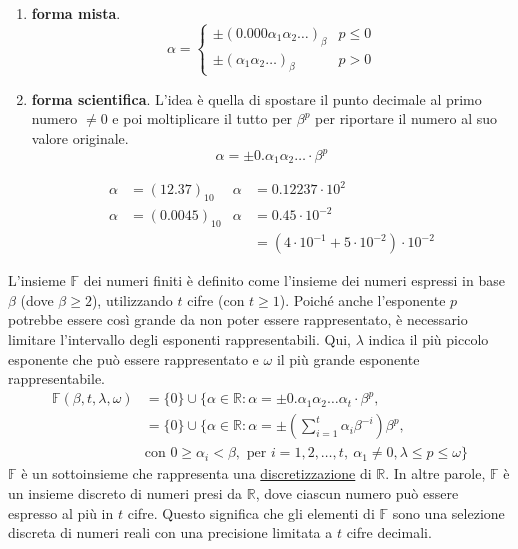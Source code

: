 \documentclass{article}
\begin{document}
\begin{enumerate}
    \item \textbf{forma mista}.
        $$\alpha=\begin{cases}
            \pm(0.000\alpha_1\alpha_2\ldots)_\beta & p\leq 0\\
            \pm(\alpha_1\alpha_2\ldots)_\beta & p>0
        \end{cases}$$
    \item \textbf{forma scientifica}. L'idea è quella di spostare il punto decimale al primo numero $\neq 0$ e
        poi moltiplicare il tutto per $\beta^p$ per riportare il numero al suo valore originale.
        $$\alpha=\pm0.\alpha_1\alpha_2\ldots\cdot\beta^p$$
        \begin{example}
            \begin{equation*}
               \begin{aligned}
                   \alpha&=(12.37)_{10} & \alpha&=0.12237\cdot 10^2 \\
                   \alpha&=(0.0045)_{10} & \alpha&=0.45\cdot 10^{-2} \\ 
                         & & &=(4\cdot 10^{-1}+5\cdot 10^{-2})\cdot 10^{-2}
               \end{aligned} 
            \end{equation*}
        \end{example}
\end{enumerate}
\begin{definition}
    L'insieme $\mathbb{F}$ dei numeri finiti è definito come l'insieme dei numeri espressi in base $\beta$
    (dove $\beta\geq 2$), utilizzando $t$ cifre (con $t\geq 1$). Poiché anche l'esponente $p$
    potrebbe essere così grande da non poter essere rappresentato, è necessario limitare
    l'intervallo degli esponenti rappresentabili. Qui, $\lambda$ indica il più piccolo esponente che
    può essere rappresentato e $\omega$ il più grande esponente rappresentabile.
    \begin{equation*}
        \begin{aligned}
            \mathbb{F}(\beta,t,\lambda,\omega)&=\{0\}\cup\{\alpha\in\mathbb{R}:\alpha=\pm0.\alpha_1\alpha_2\ldots\alpha_t\cdot\beta^p, \\
                              &=\{0\}\cup\{\alpha\in\mathbb{R}:\alpha=\pm(\sum_{i=1}^{t}\alpha_i\beta^{-i})\beta^p, \\ 
                              &\text{con } 0\geq\alpha_i<\beta, \text{ per }i=1,2,\ldots,t,\ \alpha_1\neq 0, \lambda\leq p\leq \omega\}
        \end{aligned}
    \end{equation*}
    $\mathbb{F}$ è un sottoinsieme che rappresenta una \underline{discretizzazione} di $\mathbb{R}$. In altre parole,
    $\mathbb{F}$ è un insieme discreto di numeri presi da $\mathbb{R}$, dove ciascun numero può essere espresso al più in $t$
    cifre. Questo significa che gli elementi di $\mathbb{F}$ sono una selezione discreta di numeri reali con una
    precisione limitata a $t$ cifre decimali.
\end{definition}
\end{document}
